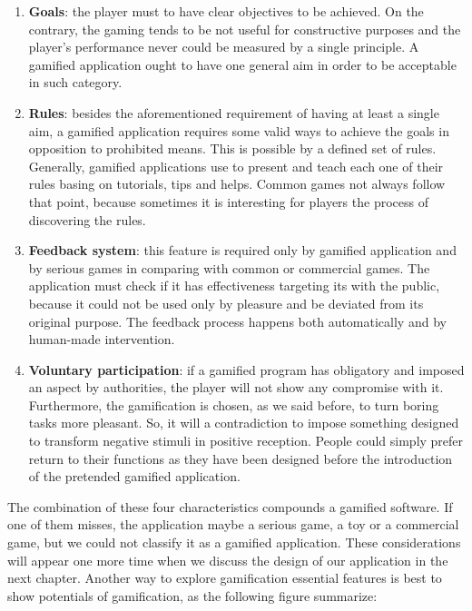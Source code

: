 \begin{enumerate}
	\item  \textbf{Goals}: the player must to have clear objectives to be achieved. On the contrary, the gaming tends to be not useful for constructive purposes and the player's performance never could be measured by a single principle. A gamified application ought to have one general aim in order to be acceptable in such category.
	\item \textbf{Rules}: besides the aforementioned requirement of having at least a single aim, a gamified application requires some valid ways to achieve the goals in opposition to prohibited means. This is possible by a defined set of rules. Generally, gamified applications use to present and teach each one of their rules basing on tutorials, tips and helps. Common games not always follow that point, because sometimes it is interesting for players the process of discovering the rules.
	\item \textbf{Feedback system}: this feature is required only by gamified  application and by serious games in comparing with common or commercial games. The application must check if it has effectiveness targeting its with the public, because it could not be used only by pleasure and be deviated from its original purpose. The feedback process happens both  automatically and by human-made intervention.
	\item \textbf{Voluntary participation}: if a gamified program has obligatory and imposed an aspect  by authorities, the player will not show any compromise with it. Furthermore, the gamification is chosen, as we said before, to turn boring tasks more pleasant. So, it will a contradiction to impose something designed to transform negative stimuli in positive reception. People could simply prefer return to their functions as they have been designed before the introduction of the pretended gamified application.
\end{enumerate}

The combination of these four characteristics compounds a gamified software. If one of them misses, the application maybe a serious game, a toy or a commercial game, but we could not classify it as a gamified application. These considerations will appear one more time when we discuss the design of our application in the next chapter. Another way to explore gamification essential features is best to show potentials of gamification, as the following figure summarize:

